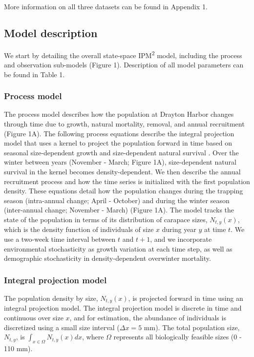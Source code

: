 \documentclass{article}
\begin{document}
More information on all three datasets can be found in Appendix 1. 

\subsection{Model description}

We start by detailing the overall state-space IPM\textsuperscript{2} model, including the process and observation sub-models (Figure 1). Description of all model parameters can be found in Table 1.

\subsubsection{Process model}

The process model describes how the population at Drayton Harbor changes through time due to growth, natural mortality, removal, and annual recruitment (Figure 1A). The following process equations describe the integral projection model that uses a kernel to project the population forward in time based on seasonal size-dependent growth and size-dependent natural survival \parencite{rees2014building}. Over the winter between years (November - March; Figure 1A), size-dependent natural survival in the kernel becomes density-dependent. We then describe the annual recruitment process and how the time series is initialized with the first population density. These equations detail how the population changes during the trapping season (intra-annual change; April - October) and during the winter season (inter-annual change; November - March) (Figure 1A). The model tracks the state of the population in terms of its distribution of carapace sizes, $N_{t, y}(x)$, which is the density function of individuals of size $x$ during year $y$ at time $t$. We use a two-week time interval between $t$ and $t + 1$, and we incorporate environmental stochasticity as growth variation at each time step, as well as demographic stochasticity in density-dependent overwinter mortality.

\subsubsection*{Integral projection model}

The population density by size, $N_{t, y}(x)$, is projected forward in time using an integral projection model. The integral projection model is discrete in time and continuous over size $x$, and for estimation, the abundance of individuals is discretized using a small size interval ($\Delta x = 5$ mm). The total population size, $N_{t,y}$, is $\int_{x \in \Omega} N_{t, y}(x)dx$, where $\Omega$ represents all biologically feasible sizes (0 - 110 mm).
\end{document}
